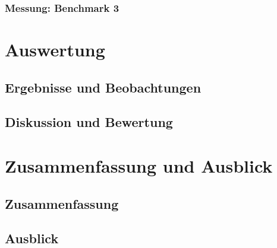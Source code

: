 \documentclass[fontsize=12pt,paper=a4,twoside=semi,parskip=half-,headsepline,headinclude]{scrreprt}
\begin{document}
\subsection{Messung: Benchmark 3}


\chapter{Auswertung}

\section{Ergebnisse und Beobachtungen}

\section{Diskussion und Bewertung}



\chapter{Zusammenfassung und Ausblick}

\section{Zusammenfassung}

\section{Ausblick}



\printbibliography


%
%
%
%
%
%
%
\end{document}
